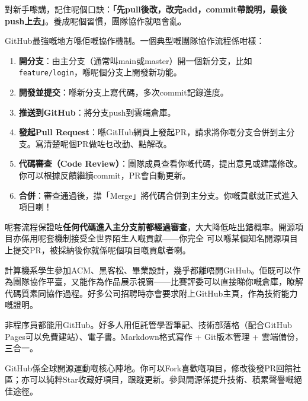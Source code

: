 對新手嚟講，記住呢個口訣：\textbf{「先pull後改，改完add，commit帶說明，最後push上去」}。養成呢個習慣，團隊協作就唔會亂。


GitHub最強嘅地方喺佢嘅協作機制。一個典型嘅團隊協作流程係咁樣：

\begin{enumerate}
  \item \textbf{開分支}：由主分支（通常叫main或master）開一個新分支，比如\texttt{feature/\allowbreak login}，喺呢個分支上開發新功能。
  \item \textbf{開發並提交}：喺新分支上寫代碼，多次commit記錄進度。
  \item \textbf{推送到GitHub}：將分支push到雲端倉庫。
  \item \textbf{發起Pull Request}：喺GitHub網頁上發起PR，請求將你嘅分支合併到主分支。寫清楚呢個PR做咗乜改動、點解改。
  \item \textbf{代碼審查（Code Review）}：團隊成員查看你嘅代碼，提出意見或建議修改。你可以根據反饋繼續commit，PR會自動更新。
  \item \textbf{合併}：審查通過後，㩒「Merge」將代碼合併到主分支。你嘅貢獻就正式進入項目喇！
\end{enumerate}

呢套流程保證咗\textbf{任何代碼進入主分支前都經過審查}，大大降低咗出錯概率。開源項目亦係用呢套機制接受全世界陌生人嘅貢獻——你完全 可以喺某個知名開源項目上提交PR，被採納後你就係呢個項目嘅貢獻者喇。



計算機系學生參加ACM、黑客松、畢業設計，幾乎都離唔開GitHub。佢既可以作為團隊協作平臺，又能作為作品展示視窗——比賽評委可以直接睇你嘅倉庫，瞭解代碼質素同協作過程。好多公司招聘時亦會要求附上GitHub主頁，作為技術能力嘅證明。


非程序員都能用GitHub。好多人用佢託管學習筆記、技術部落格（配合GitHub Pages可以免費建站）、電子書。Markdown格式寫作 + Git版本管理 + 雲端備份，三合一。


GitHub係全球開源運動嘅核心陣地。你可以Fork喜歡嘅項目，修改後發PR回饋社區；亦可以純粹Star收藏好項目，跟蹤更新。參與開源係提升技術、積累聲譽嘅絕佳途徑。


